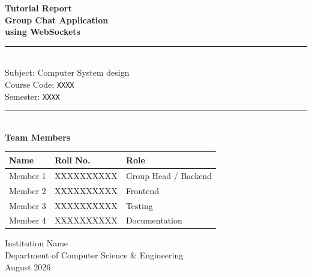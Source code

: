 \documentclass[12pt, a4paper]{article}
\begin{document}
\begin{titlepage}
    \centering
    \vspace*{1cm}

    {\LARGE\bfseries Tutorial Report}\\[0.5cm]
    {\Huge\bfseries Group Chat Application\\using WebSockets}\\[1.5cm]

    \rule{\textwidth}{0.5pt}\\[0.5cm]

    {\large Subject: Computer System design}\\[0.3cm]
    {\large Course Code: \texttt{XXXX}}\\[0.3cm]
    {\large Semester: \texttt{XXXX}}\\[0.5cm]

    \rule{\textwidth}{0.5pt}\\[1.5cm]

    {\large\bfseries Team Members}\\[0.5cm]

    \begin{tabular}{lll}
        \toprule
        \textbf{Name} & \textbf{Roll No.} & \textbf{Role} \\
        \midrule
        Member 1 & XXXXXXXXXX & Group Head / Backend \\
        Member 2 & XXXXXXXXXX & Frontend \\
        Member 3 & XXXXXXXXXX & Testing \\
        Member 4 & XXXXXXXXXX & Documentation \\
        \bottomrule
    \end{tabular}

    \vfill

    {\large Institution Name}\\[0.3cm]
    {\large Department of Computer Science \& Engineering}\\[0.3cm]
    {\large August 2026}

\end{titlepage}

\newpage
\tableofcontents
\newpage


\end{document}
